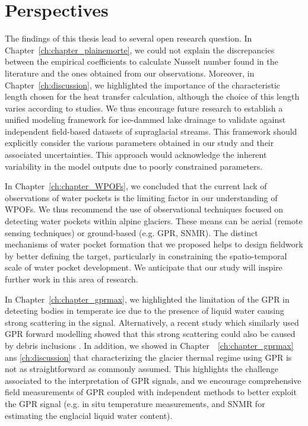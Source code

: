 \section{Perspectives}


The findings of this thesis lead to several open research question. In Chapter~\ref{ch:chapter_plainemorte}, we could not explain the discrepancies between the empirical coefficients to calculate Nusselt number found in the literature and the ones obtained from our observations. Moreover, in Chapter~\ref{ch:discussion}, we highlighted the importance of the characteristic length chosen for the heat transfer calculation, although the choice of this length varies according to studies. We thus encourage future research to establish a unified modeling framework for ice-dammed lake drainage to validate against independent field-based datasets of supraglacial streams. This framework should explicitly consider the various parameters obtained in our study and their associated uncertainties. This approach would acknowledge the inherent variability in the model outputs due to poorly constrained parameters.
%

In Chapter~\ref{ch:chapter_WPOFs}, we concluded that the current lack of observations of water pockets is the limiting factor in our understanding of WPOFs. We thus recommend the use of observational techniques focused on detecting water pockets within alpine glaciers. These means can be aerial (remote sensing techniques) or ground-based (e.g. GPR, SNMR). The distinct mechanisms of water pocket formation that we proposed helps to design fieldwork by better defining the target, particularly in constraining the spatio-temporal scale of water pocket development. We anticipate that our study will inspire further work in this area of research.
%

In Chapter~\ref{ch:chapter_gprmax}, we highlighted the limitation of the GPR in detecting bodies in temperate ice due to the presence of liquid water causing strong scattering in the signal. Alternatively, a recent study which similarly used GPR forward modelling showed that this strong scattering could also be caused by debris inclusions \citep{Santin&al2024}. In addition, we showed in Chapter~~\ref{ch:chapter_gprmax} ans \ref{ch:discussion} that characterizing the glacier thermal regime using GPR is not as straightforward as commonly assumed. This highlights the challenge associated to the interpretation of GPR signals, and we encourage comprehensive field measurements of GPR coupled with independent methods to better exploit the GPR signal (e.g. in situ temperature measurements, and SNMR for estimating the englacial liquid water content).
%

